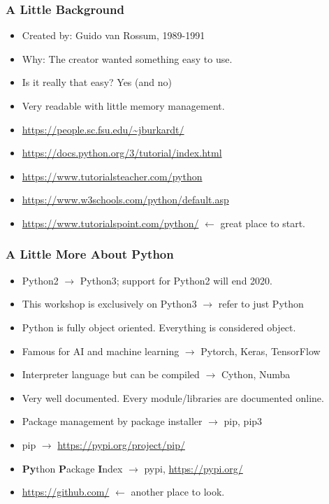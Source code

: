 
\begin{frame}
\frametitle{A Little Background}

\begin{itemize}
\item Created by: Guido van Rossum, 1989-1991
\item Why: The creator wanted something easy to use.
\item Is it really that easy? Yes (and no)
\item Very readable with little memory management.
\item \url{https://people.sc.fsu.edu/~jburkardt/}
\item \url{https://docs.python.org/3/tutorial/index.html}
\item \url{https://www.tutorialsteacher.com/python}
\item \url{https://www.w3schools.com/python/default.asp}
\item \url{https://www.tutorialspoint.com/python/} $\longleftarrow$ great place to start.
\end{itemize}

\end{frame}

\begin{frame}
\frametitle{A Little More About Python}

\begin{itemize}
\item Python2 $\longrightarrow$ Python3; support for Python2 will end 2020.
\item This workshop is exclusively on Python3 $\longrightarrow$ refer to just Python
\item Python is fully object oriented. Everything is considered object.
\item Famous for AI and machine learning $\longrightarrow$ Pytorch, Keras, TensorFlow
\item Interpreter language but can be compiled $\longrightarrow$ Cython, Numba
\item Very well documented. Every module/libraries are documented online.
\item Package management by package installer $\longrightarrow$ pip, pip3
\item pip $\longrightarrow$ \url{https://pypi.org/project/pip/}
\item \textbf{Py}thon \textbf{P}ackage \textbf{I}ndex $\longrightarrow$ pypi, \url{https://pypi.org/}
\item \url{https://github.com/} $\longleftarrow$ another place to look.
\end{itemize}

\end{frame}

